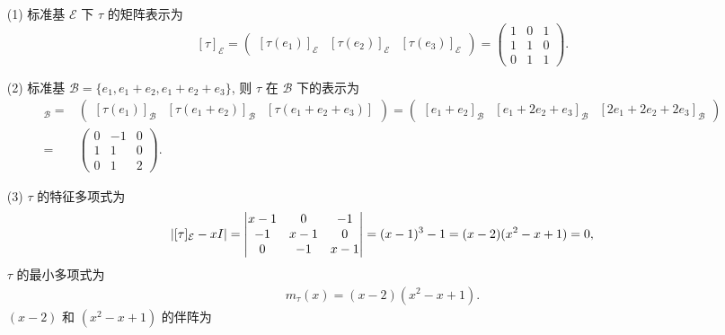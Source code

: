 \documentclass{assignment}
\begin{document}
\begin{sol}
    \begin{itemize}
        \item[(1)] 标准基 $\mathcal{E}$ 下 $\tau$ 的矩阵表示为
        \[
            [\tau]_{\mathcal{E}}=\begin{pmatrix}
                [\tau(e_1)]_{\mathcal{E}}&[\tau(e_2)]_{\mathcal{E}}&[\tau(e_3)]_{\mathcal{E}}
            \end{pmatrix}=\begin{pmatrix}
                1&0&1\\
                1&1&0\\
                0&1&1
            \end{pmatrix}.
        \]
        \item[(2)] 标准基 $\mathcal{B}=\{e_1,e_1+e_2,e_1+e_2+e_3\}$, 则 $\tau$ 在 $\mathcal{B}$ 下的表示为
        \begin{align*}
            [\tau]_{\mathcal{B}}=&\begin{pmatrix}
                [\tau(e_1)]_{\mathcal{B}}&[\tau(e_1+e_2)]_{\mathcal{B}}&[\tau(e_1+e_2+e_3)]
            \end{pmatrix}=\begin{pmatrix}
                [e_1+e_2]_{\mathcal{B}}&[e_1+2e_2+e_3]_{\mathcal{B}}&[2e_1+2e_2+2e_3]_{\mathcal{B}}
            \end{pmatrix}\\
            =&\begin{pmatrix}
                0&-1&0\\
                1&1&0\\
                0&1&2
            \end{pmatrix}.
        \end{align*}
        \item[(3)] $\tau$ 的特征多项式为
        \begin{align}
            \left\lvert[\tau]_{\mathcal{E}}-xI\right\rvert=\begin{vmatrix}
                x-1&0&-1\\
                -1&x-1&0\\
                0&-1&x-1
            \end{vmatrix}=(x-1)^3-1=(x-2)(x^2-x+1)=0,
        \end{align}
        $\tau$ 的最小多项式为
        \begin{align}
            m_{\tau}(x)=(x-2)(x^2-x+1).
        \end{align}
        $(x-2)$ 和 $(x^2-x+1)$ 的伴阵为

\end{itemize}
\end{sol}
\end{document}
